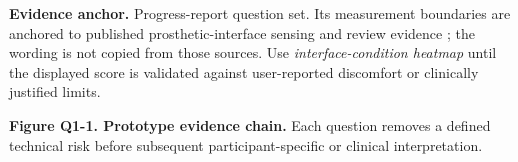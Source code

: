 \documentclass[11pt,a4paper]{article}
\newcommand{\sourceanchor}[1]{%
  \vspace{0.22em}\noindent
  {\fontsize{7.7}{9}\selectfont\color{AUBGray}\raggedright%
   \textbf{\color{AUBRed}Evidence anchor.} #1\par}}
\begin{document}
\sourceanchor{Progress-report question set. Its measurement boundaries are
anchored to published prosthetic-interface sensing and review evidence
\cite{paterno2020,q3kwak2020,q3armitage2026}; the wording is not copied from
those sources. Use \emph{interface-condition heatmap} until the displayed score
is validated against user-reported discomfort or clinically justified limits.}

\vspace{0.15em}
\begin{center}
\end{center}
{\fontsize{7.6}{8.8}\selectfont\color{AUBGray}
\textbf{Figure Q1-1. Prototype evidence chain.} Each question removes a defined
technical risk before subsequent participant-specific or clinical interpretation.\par}

\clearpage









\end{document}
